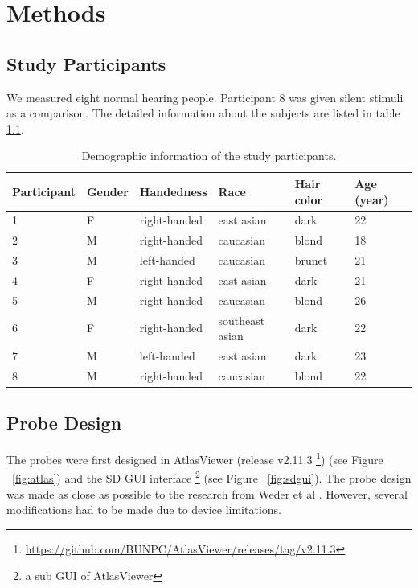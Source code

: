 \chapter{Methods}
\section {Study Participants}
We measured eight normal hearing people. Participant 8 was given silent stimuli as a comparison. The detailed information about the subjects are listed in table \ref{table:1}.

\begin{table}[h!]
   \centering

    \begin{tabular}{p{2.3cm} | p{1.5cm} |p{2.5cm} | p{2.8cm} | p{2.1cm} | p{2.2cm}} %
      \textbf{Participant} & \textbf {Gender}& \textbf{Handedness} & \textbf{Race} & \textbf{Hair color} &\textbf {Age (year)}\\ 
      \hline
      1 & F & right-handed & east asian & dark & 22\\
      2 & M & right-handed  & caucasian & blond & 18 \\
      3 & M & left-handed &  caucasian & brunet & 21\\
      4 & F  & right-handed & east asian & dark& 21 \\
      5 & M & right-handed  &  caucasian& blond & 26 \\
      6 &  F & right-handed & southeast asian & dark & 22 \\
      7 &  M & left-handed &  east asian & dark & 23 \\
      8 & M & right-handed  & caucasian & blond & 22 \\
    \end{tabular}
    
    \caption{Demographic information of the study participants.}
    \label{table:1}
\end{table}

\section {Probe Design}
The probes were first designed in AtlasViewer (release v2.11.3 \footnote{\url{https://github.com/BUNPC/AtlasViewer/releases/tag/v2.11.3}})  (see Figure ~\ref{fig:atlas}) \citep {10.1117/1.NPh.2.2.020801} and the SD GUI interface \footnote{a sub GUI of AtlasViewer} (see Figure ~\ref{fig:sdgui}). The probe design was made as close as possible to the research from Weder et al \citeyearpar{Weder2018}. However, several modifications had to be made due to device limitations.



